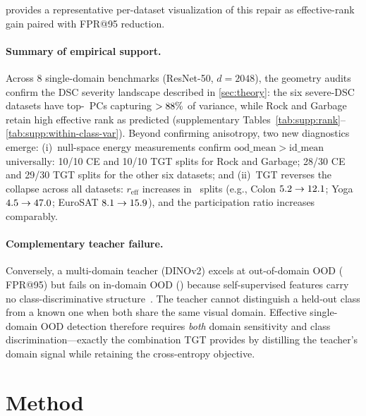 \documentclass[runningheads]{llncs}
\begin{document}
 provides a representative per-dataset visualization of this repair as effective-rank gain paired with FPR@95 reduction.

\paragraph{Summary of empirical support.}
Across 8 single-domain benchmarks (ResNet-50, $d{=}2048$), the geometry audits confirm the DSC severity landscape described in \cref{sec:theory}: the six severe-DSC datasets have top-\DSCTopPCCount\ PCs capturing $>88\%$ of variance, while Rock and Garbage retain high effective rank as predicted (supplementary Tables~\ref{tab:supp:rank}--\ref{tab:supp:within-class-var}).
Beyond confirming anisotropy, two new diagnostics emerge:
(i)~null-space energy measurements confirm $\mathrm{ood\_mean} > \mathrm{id\_mean}$ universally: 10/10 CE and 10/10 TGT splits for Rock and Garbage; 28/30 CE and 29/30 TGT splits for the other six datasets;
and (ii)~TGT reverses the collapse across all datasets: $r_{\mathrm{eff}}$ increases in \DSCReffIncreaseSplits\ splits (e.g., Colon $5.2 \to 12.1$; Yoga $4.5 \to 47.0$; EuroSAT $8.1 \to 15.9$), and the participation ratio increases comparably.

\paragraph{Complementary teacher failure.}
Conversely, a multi-domain teacher (DINOv2) excels at out-of-domain OOD (\TeacherOnlyFaroodFPR{} FPR@95) but fails on in-domain OOD (\TeacherOnlyNearoodFPR{}) because self-supervised features carry no class-discriminative structure~\cite{yangcan}.
The teacher cannot distinguish a held-out class from a known one when both share the same visual domain.
Effective single-domain OOD detection therefore requires \emph{both} domain sensitivity and class discrimination---exactly the combination TGT provides by distilling the teacher's domain signal while retaining the cross-entropy objective.


\section{Method}
\label{sec:method}
\end{document}
